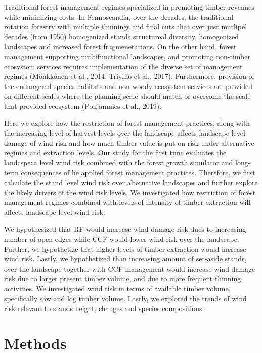 \documentclass[]{elsarticle} %
\begin{document}
Traditional forest management regimes specialized in promoting timber
revenues while minimizing costs. In Fennoscandia, over the decades, the
traditional rotation forestry with multiple thinnings and final cuts
that over just mutlipel decades (from 1950) homogenized stands
structureal diversity, homogenized landscapes and increased forest
fragmenetations. On the other hand, forest management supporting
multifunctional landscapes, and promoting non-timber ecosystem services
requires implementation of the diverse set of management regimes
(Mönkkönen et al., 2014; Triviño et al., 2017). Furthermore, provision
of the endangered species habitats and non-woody ecosystem services are
provided on different scales where the planning scale should match or
overcome the scale that provided ecosystem (Pohjanmies et al., 2019).

Here we explore how the restriction of forest management practices,
along with the increasing level of harvest levels over the landscape
affects landscape level damage of wind risk and how much timber value is
put on risk under alternative regimes and extraction levels. Our study
for the first time evaluates the landcspeca level wind risk combined
with the forest growth simulator and long-term consequences of he
applied forest management practices. Therefore, we first calculate the
stand level wind risk over alternative landscapes and further explore
the likely drivers of the wind risk levels. We investigated how
restriction of forest management regimes combined with levels of
intensity of timber extraction will affects landscape level wind risk.

We hypothesized that RF would increase wind damage risk dues to
increasing number of open edges while CCF would lower wind risk over the
landscape. Further, we hypothetize that higher levels of timber
extraction would increase wind risk. Lastly, we hypothetized than
increasing amount of set-aside stands, over the landscape together with
CCF management would increase wind damage risk due to larger present
timber volume, and due to more frequent thinning activities. We
investigated wind risk in terms of available timber volume, specifically
saw and log timber volume. Lastly, we explored the trends of wind risk
relevant to stands height, changes and species compositions.

\section{Methods}\label{methods}
\end{document}
